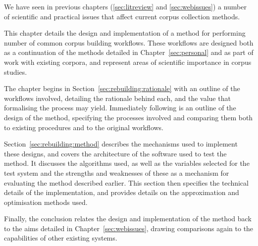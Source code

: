 

We have seen in previous chapters (\ref{sec:litreview} and \ref{sec:webissues}) a number of scientific and practical issues that affect current corpus collection methods.

This chapter details the design and implementation of a method for performing number of common corpus building workflows.  These workflows are designed both as a continuation of the methods detailed in Chapter~\ref{sec:personal} and as part of work with existing corpora, and represent areas of scientific importance in corpus studies.




The chapter begins in Section~\ref{sec:rebuilding:rationale} with an outline of the workflows involved, detailing the rationale behind each, and the value that formalising the process may yield.  Immediately following is an outline of the design of the method, specifying the processes involved and comparing them both to existing procedures and to the original workflows.

Section~\ref{sec:rebuilding:method} describes the mechanisms used to implement these designs, and covers the architecture of the software used to test the method.  It discusses the algorithms used, as well as the variables selected for the test system and the strengths and weaknesses of these as a mechanism for evaluating the method described earlier.  This section then specifies the technical details of the implementation, and provides details on the approximation and optimisation methods used.  

Finally, the conclusion relates the design and implementation of the method back to the aims detailed in Chapter~\ref{sec:webissues}, drawing comparisons again to the capabilities of other existing systems. 
